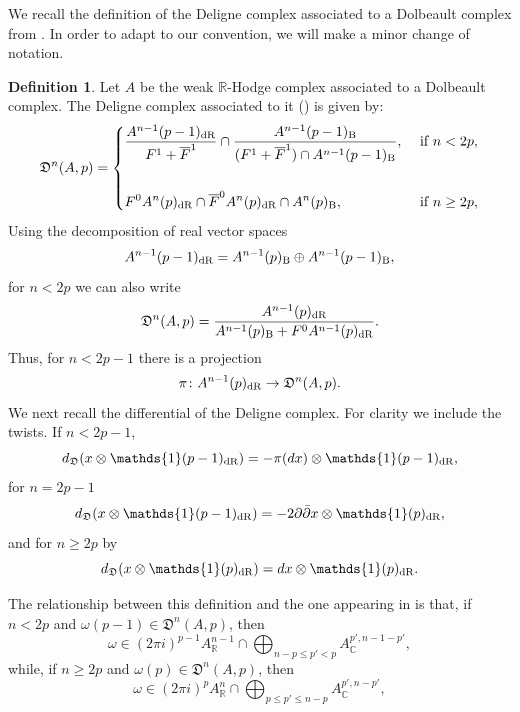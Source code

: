 \documentclass[11pt,a4paper]{amsart}
\newcommand{\Betti}{\text{\rm B}}
\newcommand{\dR}{\text{\rm dR}}
\newcommand{\C}{\mathds{C}}
\newcommand{\R}{\mathds{R}}
\newcommand{\fD}{\mathfrak{D}}
\newcommand{\bfone}{{\mathds{1}}}
\numberwithin{equation}{section}
\theoremstyle{plain}
\theoremstyle{definition}
\newtheorem{df}[prop]{Definition}
\begin{document}
We recall the definition of the Deligne complex associated to a
Dolbeault complex from \cite[Definition 2.5]{Burgos:CDB}. In order to adapt to our convention, we will make a minor change of notation.
\begin{df} Let $A$ be the weak $\R$-Hodge complex associated to a
  Dolbeault complex. The Deligne complex associated to it
  (\cite[Definition 2.5, Theorem 2.6]{Burgos:CDB}) is given by:
\begin{displaymath}
  \fD^{n}(A,p)=
  \begin{cases}\displaystyle
    \frac{A^{n-1}(p-1)_{\dR}}{F^{1}+\overline F^{1}}\cap
    \frac{A^{n-1}(p-1)_{\Betti}}{(F^{1}+\overline F^{1})\cap A^{n-1}(p-1)_{\Betti}},&\text{
      if }n < 2p,\\[10mm]
    \displaystyle
    F^{0}A^{n}(p)_{\dR}\cap \overline{F}^{0}A^{n}(p)_{\dR}\cap A^{n}(p)_{\Betti},&\text{
      if }n \ge 2p,
  \end{cases}
\end{displaymath}
Using the decomposition of real vector spaces
\begin{displaymath}
  A^{n-1}(p-1)_{\dR}=A^{n-1}(p)_{\Betti}\oplus A^{n-1}(p-1)_{\Betti},
\end{displaymath}
for
$n<2p$ we can also write 
\begin{equation}
  \label{eq:33}
  \fD^{n}(A,p)=\frac{A^{n-1}(p)_{\dR}}{A^{n-1}(p)_{\Betti} + F^{0}A^{n-1}(p)_{\dR}}. 
\end{equation}
Thus, for $n<2p-1$ there is a projection
\begin{displaymath}
  \pi \colon A^{n-1}(p)_{\dR}\to \fD^{n}(A,p). 
\end{displaymath}
We next recall the differential of the Deligne complex. For clarity we include the
twists.  If
$n<2p-1$,
\begin{displaymath}
  d_{\fD}(x\otimes \bfone(p-1)_{\dR})=-\pi (dx)\otimes \bfone(p-1)_{\dR},
\end{displaymath}
for $n=2p-1$
\begin{displaymath}
  d_{\fD}(x\otimes \bfone(p-1)_{\dR})=-2\partial\bar \partial x\otimes \bfone(p)_{\dR},
\end{displaymath}
and for $n\ge 2p$ by
\begin{displaymath}
  d_{\fD}(x\otimes \bfone(p)_{\dR})=d x\otimes \bfone(p)_{\dR}.
\end{displaymath}
  \end{df}

  The relationship between this definition and the one appearing in
  \cite[Definition 2.5]{Burgos:CDB} is that, if $n<2p$ and
  $\omega(p-1)\in \fD^{n}(A,p)$, then 
  \begin{displaymath}
    \omega \in (2\pi i)^{p-1}A^{n-1}_{\R}\cap \bigoplus_{n-p\le p'<p}A^{p',n-1-p'}_{\C},
  \end{displaymath}
  while, if $n\ge 2p$ and $\omega(p)\in \fD^{n}(A,p)$, then
  \begin{displaymath}
    \omega \in (2\pi i)^{p}A^{n}_{\R}\cap \bigoplus_{p\le p' \le n-p}A^{p',n-p'}_{\C},    
  \end{displaymath}
\end{document}

